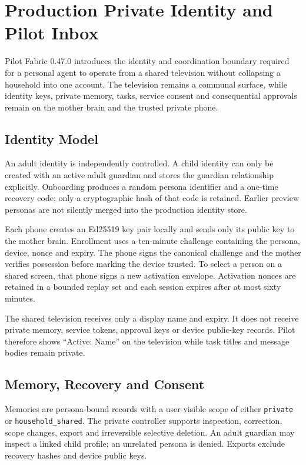 \section{Production Private Identity and Pilot Inbox}
\label{sec:pilot-private-identity-agent-inbox}

Pilot Fabric 0.47.0 introduces the identity and coordination boundary required for a
personal agent to operate from a shared television without collapsing a household into
one account. The television remains a communal surface, while identity keys, private
memory, tasks, service consent and consequential approvals remain on the mother brain and
the trusted private phone.

\subsection{Identity Model}

An adult identity is independently controlled. A child identity can only be created with
an active adult guardian and stores the guardian relationship explicitly. Onboarding
produces a random persona identifier and a one-time recovery code; only a cryptographic
hash of that code is retained. Earlier preview personas are not silently merged into the
production identity store.

Each phone creates an Ed25519 key pair locally and sends only its public key to the mother
brain. Enrollment uses a ten-minute challenge containing the persona, device, nonce and
expiry. The phone signs the canonical challenge and the mother verifies possession before
marking the device trusted. To select a person on a shared screen, that phone signs a new
activation envelope. Activation nonces are retained in a bounded replay set and each
session expires after at most sixty minutes.

The shared television receives only a display name and expiry. It does not receive private
memory, service tokens, approval keys or device public-key records. Pilot therefore shows
``Active: Name'' on the television while task titles and message bodies remain private.

\subsection{Memory, Recovery and Consent}

Memories are persona-bound records with a user-visible scope of either
\texttt{private} or \texttt{household\_shared}. The private controller supports inspection,
correction, scope changes, export and irreversible selective deletion. An adult guardian
may inspect a linked child profile; an unrelated persona is denied. Exports exclude
recovery hashes and device public keys.

